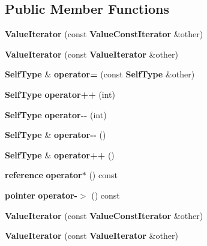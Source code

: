 \subsection*{Public Member Functions}
\begin{DoxyCompactItemize}
\item 
{\bfseries Value\+Iterator} (const {\bf Value\+Const\+Iterator} \&other)\label{class_json_1_1_value_iterator_aa85aa208670891670392259efa0143bb}

\item 
{\bfseries Value\+Iterator} (const {\bf Value\+Iterator} \&other)\label{class_json_1_1_value_iterator_a7d5e58a9a4a553968acdf3064b39d21c}

\item 
{\bf Self\+Type} \& {\bfseries operator=} (const {\bf Self\+Type} \&other)\label{class_json_1_1_value_iterator_a8e23312b1db874f7e403fd7e76611bdc}

\item 
{\bf Self\+Type} {\bfseries operator++} (int)\label{class_json_1_1_value_iterator_abcf4ddd994a010742cd4a436d65acd08}

\item 
{\bf Self\+Type} {\bfseries operator-\/-\/} (int)\label{class_json_1_1_value_iterator_a06d6a29d96caf6af324a53973159e12b}

\item 
{\bf Self\+Type} \& {\bfseries operator-\/-\/} ()\label{class_json_1_1_value_iterator_a811302a868518a0995a9def955df5720}

\item 
{\bf Self\+Type} \& {\bfseries operator++} ()\label{class_json_1_1_value_iterator_a92146c46f8249e2b2d12869e70cd4cee}

\item 
{\bf reference} {\bfseries operator$\ast$} () const \label{class_json_1_1_value_iterator_aaa5be3457eedf0526a03b8a3b4c7c0a0}

\item 
{\bf pointer} {\bfseries operator-\/$>$} () const \label{class_json_1_1_value_iterator_ad9882e4ce815cef6a504afa113544bfb}

\item 
{\bfseries Value\+Iterator} (const {\bf Value\+Const\+Iterator} \&other)\label{class_json_1_1_value_iterator_aa85aa208670891670392259efa0143bb}

\item 
{\bfseries Value\+Iterator} (const {\bf Value\+Iterator} \&other)\label{class_json_1_1_value_iterator_a7d5e58a9a4a553968acdf3064b39d21c}


\end{DoxyCompactItemize}
